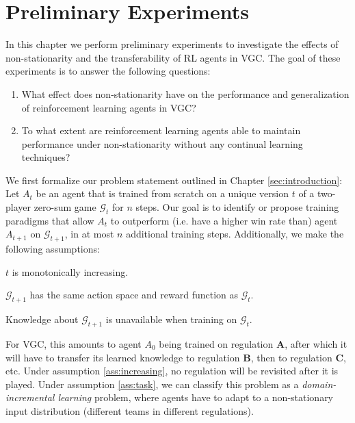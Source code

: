 %
%
\chapter{Preliminary Experiments} \label{sec:preliminary}
In this chapter we perform preliminary experiments to investigate the effects of non-stationarity and the transferability of RL agents in VGC.
The goal of these experiments is to answer the following questions:

\begin{enumerate}
    \item What effect does non-stationarity have on the performance and generalization of reinforcement learning agents in VGC?
    \item To what extent are reinforcement learning agents able to maintain performance under non-stationarity without any continual learning techniques?
\end{enumerate}

We first formalize our problem statement outlined in Chapter \ref{sec:introduction}:
Let $A_t$ be an agent that is trained from scratch on a unique version $t$ of a two-player zero-sum game $\mathcal{G}_t$ for $n$ steps.
Our goal is to identify or propose training paradigms that allow $A_t$ to outperform (i.e. have a higher win rate than) agent $A_{t+1}$ on $\mathcal{G}_{t+1}$, in at most $n$ additional training steps.
Additionally, we make the following assumptions:

\begin{assumption} \label{ass:increasing}
    $t$ is monotonically increasing.
\end{assumption}

\begin{assumption} \label{ass:task}
    $\mathcal{G}_{t+1}$ has the same action space and reward function as $\mathcal{G}_{t}$.
\end{assumption}

\begin{assumption} \label{ass:availability}
    Knowledge about $\mathcal{G}_{t+1}$ is unavailable when training on $\mathcal{G}_{t}$.
\end{assumption}

For VGC, this amounts to agent $A_0$ being trained on regulation \textbf{A}, after which it will have to transfer its learned knowledge to regulation \textbf{B}, then to regulation \textbf{C}, etc.
Under assumption \ref{ass:increasing}, no regulation will be revisited after it is played.
Under assumption \ref{ass:task}, we can classify this problem as a \textit{domain-incremental learning} problem, where agents have to adapt to a non-stationary input distribution (different teams in different regulations).


